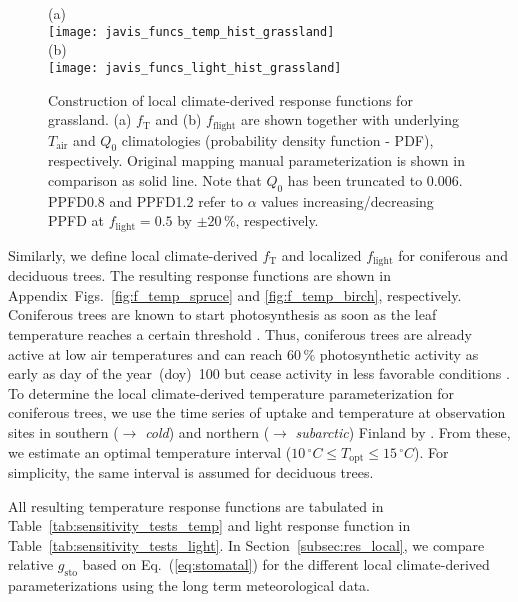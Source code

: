 \documentclass[bg, manuscript]{copernicus}
\begin{document}
\begin{figure}[t]
  \centering
  (a)\\
  \texttt{[image: javis\_funcs\_temp\_hist\_grassland]}\\
  (b)\\
  \texttt{[image: javis\_funcs\_light\_hist\_grassland]}
\caption{Construction of local climate-derived response functions for grassland. (a) $f_\mathrm{T}$ and (b) $f_\mathrm{flight}$ are shown together with underlying $T_\mathrm{air}$ and $Q_0$ climatologies (probability density function - PDF), respectively. Original mapping manual parameterization is shown in comparison as solid line. Note that $Q_0$ has been truncated to $0.006$. PPFD0.8 and PPFD1.2 refer to $\alpha$ values increasing/decreasing PPFD at $f_\mathrm{light}=0.5$ by $\pm 20\,\%$, respectively.}
\label{fig:f_temp_grassland}
\end{figure}

Similarly, we define local climate-derived $f_\mathrm{T}$ and localized $f_\mathrm{light}$ for coniferous and deciduous trees. The resulting response functions are shown in Appendix~Figs.~\ref{fig:f_temp_spruce} and \ref{fig:f_temp_birch}, respectively.
Coniferous trees are known to start photosynthesis as soon as the leaf temperature reaches a certain threshold \citep{TB:Kolari2007}. Thus, coniferous trees are already active at low air temperatures and can reach $60\,\unit{\%}$ photosynthetic activity as early as day of the year~(\unit{doy})~100 but cease activity in less favorable conditions \citep{TB:Kolari2007, TP:Wallin2013}. 
To determine the local climate-derived temperature parameterization for coniferous trees, we use the time series of  uptake and temperature at observation sites in southern ($\rightarrow$ \emph{cold}) and northern ($\rightarrow$ \emph{subarctic}) Finland by \citet{TB:Kolari2007}. From these, we estimate an optimal temperature interval ($10\,\unit{^\circ C}\le T_\mathrm{opt} \le 15\,\unit{^\circ C}$). For simplicity, the same interval is assumed for deciduous trees.

All resulting temperature response functions are tabulated in Table~\ref{tab:sensitivity_tests_temp} and light response function in Table~\ref{tab:sensitivity_tests_light}. In Section~\ref{subsec:res_local}, we compare relative $g_\mathrm{sto}$ based on Eq.~(\ref{eq:stomatal}) for the different local climate-derived parameterizations using the long term meteorological data.
\end{document}
